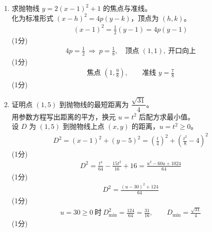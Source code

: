 \begin{solution}
    \begin{enumerate}[label=(\alph*)]
        \item 求抛物线 $y=2(x-1)^2+1$ 的焦点与准线。\\
        化为标准形式 $(x-h)^2=4p(y-k)$，顶点为 $(h,k)$。\\
        \begin{align*}
            (x-1)^2=\frac12(y-1)=4p(y-1)
        \end{align*}
        \hfill (1分) \\
        \begin{align*}
            4p=\frac12\ \Rightarrow\ p=\frac18,\quad\text{顶点 }(1,1),\ \text{开口向上}
        \end{align*}
        \hfill (1分) \\
        \begin{align*}
            \text{焦点 }\left(1,\frac98\right),\qquad\text{准线 }y=\frac78
        \end{align*}
        \hfill (1分)

        \item 证明点 $(1,5)$ 到抛物线的最短距离为 $\dfrac{\sqrt{31}}{4}$。\\
        用参数方程写出距离的平方，换元 $u=t^2$ 后配方求最小值。\\
        设 $D$ 为 $(1,5)$ 到抛物线上点 $(x,y)$ 的距离，$u=t^2\ge0$。\\
        \begin{align*}
            D^2=(x-1)^2+(y-5)^2=\left(\frac t4\right)^2+\left(\frac{t^2}{8}-4\right)^2
        \end{align*}
        \hfill (1分) \\
        \begin{align*}
            D^2=\frac{t^4}{64}-\frac{15t^2}{16}+16=\frac{u^2-60u+1024}{64}
        \end{align*}
        \hfill (1分) \\
        \begin{align*}
            D^2=\frac{(u-30)^2+124}{64}
        \end{align*}
        \hfill (1分) \\
        \begin{align*}
            u=30\ge0\ \text{时}\ D^2_{\min}=\frac{124}{64}=\frac{31}{16},\qquad D_{\min}=\frac{\sqrt{31}}{4}
        \end{align*}
        \hfill (1分)


\end{enumerate}
\end{solution}
